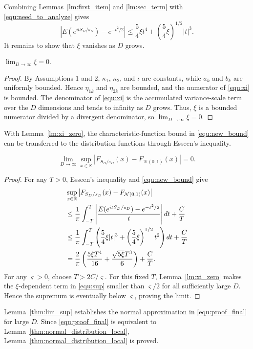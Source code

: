 Combining Lemmas~\ref{lm:first_item} and \ref{lm:sec_term} with \eqref{equ:need_to_analyze} gives
\begin{equation}
\left|E(e^{itS_D/s_D})-e^{-t^2/2}\right|
\leq
\frac{5}{4}\xi t^4+\left(\frac{5}{4}\xi\right)^{1/2}|t|^3 .
\label{equ:new_bound}
\end{equation}
It remains to show that $\xi$ vanishes as $D$ grows.
\begin{lemma}[Vanishing of $\xi$]\label{lm:xi_zero}
$\lim_{D\to\infty}\xi=0$.
\begin{proof}
By Assumptions 1 and 2, $\kappa_1$, $\kappa_2$, and $\iota$ are constants, while $a_k$ and $b_k$ are uniformly bounded. Hence $\eta_{1k}$ and $\eta_{2k}$ are bounded, and the numerator of \eqref{equ:xi} is bounded. The denominator of \eqref{equ:xi} is the accumulated variance-scale term over the $D$ dimensions and tends to infinity as $D$ grows. Thus, $\xi$ is a bounded numerator divided by a divergent denominator, so $\lim_{D\to\infty}\xi=0$.
\end{proof}
\end{lemma}
With Lemma~\ref{lm:xi_zero}, the characteristic-function bound in \eqref{equ:new_bound} can be transferred to the distribution functions through Esseen's inequality.
\begin{lemma}\label{thm:lim_sup}
\[
\lim_{D\to\infty}\sup_{x\in\mathbb{R}}
\left|F_{S_D/s_D}(x)-F_{\mathcal{N}(0,1)}(x)\right|=0 .
\]
\end{lemma}
\begin{proof}
For any $T>0$, Esseen's inequality and \eqref{equ:new_bound} give
\begin{align}
&\sup_{x\in\mathbb{R}}
\left|F_{S_D/s_D}(x)-F_{\mathcal{N}(0,1)}(x)\right| \notag\\
&\leq
\frac{1}{\pi}\int_{-T}^{T}
\left|\frac{E(e^{itS_D/s_D})-e^{-t^2/2}}{t}\right|dt
+\frac{C}{T} \notag\\
&\leq
\frac{1}{\pi}\int_{-T}^{T}
\left(\frac{5}{4}\xi |t|^3
+\left(\frac{5}{4}\xi\right)^{1/2}t^2\right)dt
+\frac{C}{T} \notag\\
&=
\frac{2}{\pi}\left(
\frac{5\xi T^4}{16}
+\frac{\sqrt{5\xi}T^3}{6}\right)
+\frac{C}{T}.
\label{equ:sup}
\end{align}
For any $\varsigma>0$, choose $T>2C/\varsigma$. For this fixed $T$, Lemma~\ref{lm:xi_zero} makes the $\xi$-dependent term in \eqref{equ:sup} smaller than $\varsigma/2$ for all sufficiently large $D$. Hence the supremum is eventually below $\varsigma$, proving the limit.
\end{proof}
Lemma~\ref{thm:lim_sup} establishes the normal approximation in \eqref{equ:proof_final} for large $D$. Since \eqref{equ:proof_final} is equivalent to Lemma~\ref{thm:normal_distribution_local}, Lemma~\ref{thm:normal_distribution_local} is proved.

